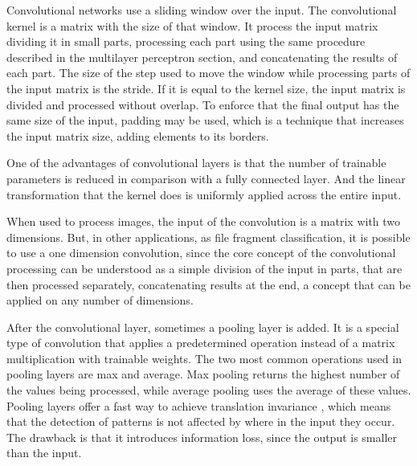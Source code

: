{\color{red}
Convolutional networks \cite{lecun_backpropagation_1989} \cite{lecun_convolutional_1995} use a sliding window over the input. The convolutional kernel is a matrix with the size of that window. It process the input matrix dividing it in small parts, processing each part using the same procedure described in the multilayer perceptron section, and concatenating the results of each part. The size of the step used to move the window while processing parts of the input matrix is the stride. If it is equal to the kernel size, the input matrix is divided and processed without overlap. To enforce that the final output has the same size of the input, padding may be used, which is a technique that increases the input matrix size, adding elements to its borders.
}

One of the advantages of convolutional layers is that the number of trainable parameters is reduced in comparison with a fully connected layer. And the linear transformation that the kernel does is uniformly applied across the entire input.

When used to process images, the input of the convolution is a matrix with two dimensions.
{\color{red}
But, in other applications, as file fragment classification, it is possible to use a one dimension convolution, since the core concept of the convolutional processing can be understood as a simple division of the input in parts, that are then processed separately, concatenating results at the end, a concept that can be applied on any number of dimensions.
}

{\color{red}
After the convolutional layer, sometimes a pooling layer is added. It is a special type of convolution that applies a predetermined operation instead of a matrix multiplication with trainable weights. The two most common operations used in pooling layers are max and average. Max pooling returns the highest number of the values being processed, while average pooling uses the average of these values. Pooling layers offer a fast way to achieve translation invariance \cite{hinton_learning_1987}, which means that the detection of patterns is not affected by where in the input they occur. The drawback is that it introduces information loss, since the output is smaller than the input.
}